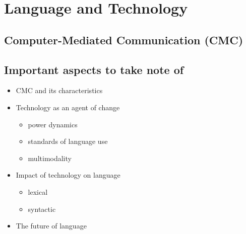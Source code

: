 \documentclass[../main.tex]{subfiles}
\begin{document}
    \chapter{Language and Technology}
    \section{Computer-Mediated Communication (CMC)}

    \section{Important aspects to take note of}
    \begin{itemize}
        \item CMC and its characteristics
        \item Technology as an agent of change \begin{itemize}
            \item power dynamics
            \item standards of language use
            \item multimodality
        \end{itemize}
        \item Impact of technology on language \begin{itemize}
            \item lexical
            \item syntactic
        \end{itemize}
        \item The future of language
    \end{itemize}
\end{document}
